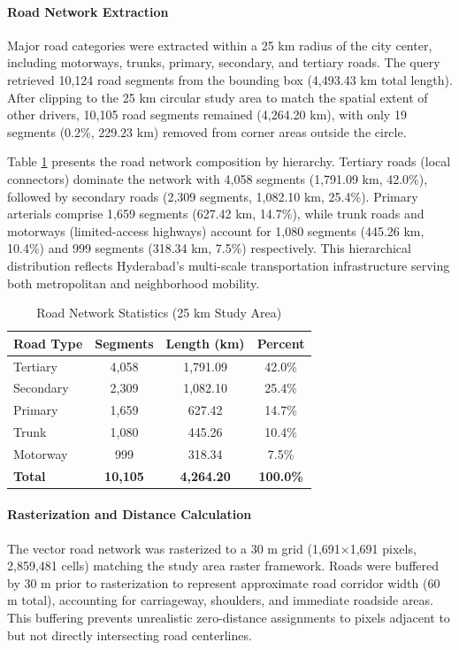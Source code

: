 \documentclass[12pt,a4paper]{article}
\begin{document}
\paragraph{Road Network Extraction}
Major road categories were extracted within a 25 km radius of the city center, including motorways, trunks, primary, secondary, and tertiary roads. The query retrieved 10,124 road segments from the bounding box (4,493.43 km total length). After clipping to the 25 km circular study area to match the spatial extent of other drivers, 10,105 road segments remained (4,264.20 km), with only 19 segments (0.2\%, 229.23 km) removed from corner areas outside the circle.

Table \ref{tab:road_network} presents the road network composition by hierarchy. Tertiary roads (local connectors) dominate the network with 4,058 segments (1,791.09 km, 42.0\%), followed by secondary roads (2,309 segments, 1,082.10 km, 25.4\%). Primary arterials comprise 1,659 segments (627.42 km, 14.7\%), while trunk roads and motorways (limited-access highways) account for 1,080 segments (445.26 km, 10.4\%) and 999 segments (318.34 km, 7.5\%) respectively. This hierarchical distribution reflects Hyderabad's multi-scale transportation infrastructure serving both metropolitan and neighborhood mobility.

\begin{table}[H]
\caption{Road Network Statistics (25 km Study Area)}
\label{tab:road_network}
\centering
\small
\renewcommand{\arraystretch}{1.2}
\begin{tabular}{lccc}
\toprule
\textbf{Road Type} & \textbf{Segments} & \textbf{Length (km)} & \textbf{Percent} \\
\midrule
Tertiary & 4,058 & 1,791.09 & 42.0\% \\
Secondary & 2,309 & 1,082.10 & 25.4\% \\
Primary & 1,659 & 627.42 & 14.7\% \\
Trunk & 1,080 & 445.26 & 10.4\% \\
Motorway & 999 & 318.34 & 7.5\% \\
\midrule
\textbf{Total} & \textbf{10,105} & \textbf{4,264.20} & \textbf{100.0\%} \\
\bottomrule
\end{tabular}
\end{table}

\paragraph{Rasterization and Distance Calculation}
The vector road network was rasterized to a 30 m grid (1,691$\times$1,691 pixels, 2,859,481 cells) matching the study area raster framework. Roads were buffered by 30 m prior to rasterization to represent approximate road corridor width (60 m total), accounting for carriageway, shoulders, and immediate roadside areas. This buffering prevents unrealistic zero-distance assignments to pixels adjacent to but not directly intersecting road centerlines.
\end{document}
